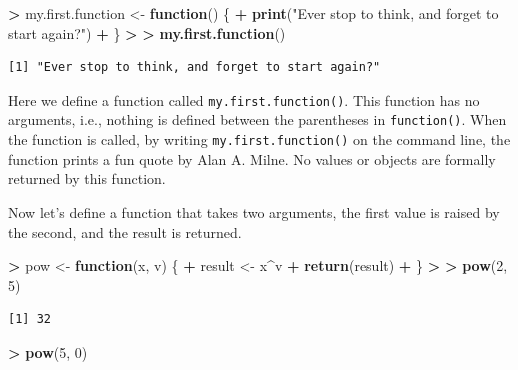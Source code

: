 \documentclass[]{krantz}
\makeatletter
\newenvironment{Shaded}{\begin{snugshade}}{\end{snugshade}}
\newcommand{\ControlFlowTok}[1]{\textcolor[rgb]{0.27,0.27,0.27}{\textbf{#1}}}
\newcommand{\DecValTok}[1]{\textcolor[rgb]{0.06,0.06,0.06}{#1}}
\newcommand{\ErrorTok}[1]{\textcolor[rgb]{0.14,0.14,0.14}{\textbf{#1}}}
\newcommand{\KeywordTok}[1]{\textcolor[rgb]{0.27,0.27,0.27}{\textbf{#1}}}
\newcommand{\NormalTok}[1]{#1}
\newcommand{\OperatorTok}[1]{\textcolor[rgb]{0.43,0.43,0.43}{\textbf{#1}}}
\newcommand{\StringTok}[1]{\textcolor[rgb]{0.5,0.5,0.5}{#1}}
\newenvironment{kframe}{%
\medskip{}
\setlength{\fboxsep}{.8em}
 \def\at@end@of@kframe{}%
 \ifinner\ifhmode%
  \def\at@end@of@kframe{\end{minipage}}%
  \begin{minipage}{\columnwidth}%
 \fi\fi%
 \def\FrameCommand##1{\hskip\@totalleftmargin \hskip-\fboxsep
 \colorbox{shadecolor}{##1}\hskip-\fboxsep
     \hskip-\linewidth \hskip-\@totalleftmargin \hskip\columnwidth}%
 \MakeFramed {\advance\hsize-\width
   \@totalleftmargin\z@ \linewidth\hsize
   \@setminipage}}%
 {\par\unskip\endMakeFramed%
 \at@end@of@kframe}
\renewenvironment{Shaded}{\begin{kframe}}{\end{kframe}}
\makeatother
\begin{document}
\begin{Shaded}
\begin{Highlighting}[]
\OperatorTok{>}\StringTok{ }\NormalTok{my.first.function <-}\StringTok{ }\ControlFlowTok{function}\NormalTok{() \{}
\OperatorTok{+}\StringTok{   }\KeywordTok{print}\NormalTok{(}\StringTok{"Ever stop to think, and forget to start again?"}\NormalTok{)}
\OperatorTok{+}\StringTok{ }\NormalTok{\}}
\OperatorTok{>}\StringTok{ }
\ErrorTok{>}\StringTok{ }\KeywordTok{my.first.function}\NormalTok{()}
\end{Highlighting}
\end{Shaded}

\begin{verbatim}
[1] "Ever stop to think, and forget to start again?"
\end{verbatim}

Here we define a function called \texttt{my.first.function()}. This function has no arguments, i.e., nothing is defined between the parentheses in \texttt{function()}. When the function is called, by writing \texttt{my.first.function()} on the command line, the function prints a fun quote by Alan A. Milne. No values or objects are formally returned by this function.

Now let's define a function that takes two arguments, the first value is raised by the second, and the result is returned.

\begin{Shaded}
\begin{Highlighting}[]
\OperatorTok{>}\StringTok{ }\NormalTok{pow <-}\StringTok{ }\ControlFlowTok{function}\NormalTok{(x, v) \{}
\OperatorTok{+}\StringTok{   }\NormalTok{result <-}\StringTok{ }\NormalTok{x}\OperatorTok{^}\NormalTok{v}
\OperatorTok{+}\StringTok{   }\KeywordTok{return}\NormalTok{(result)}
\OperatorTok{+}\StringTok{ }\NormalTok{\}}
\OperatorTok{>}\StringTok{ }
\ErrorTok{>}\StringTok{ }\KeywordTok{pow}\NormalTok{(}\DecValTok{2}\NormalTok{, }\DecValTok{5}\NormalTok{)}
\end{Highlighting}
\end{Shaded}

\begin{verbatim}
[1] 32
\end{verbatim}

\begin{Shaded}
\begin{Highlighting}[]
\OperatorTok{>}\StringTok{ }\KeywordTok{pow}\NormalTok{(}\DecValTok{5}\NormalTok{, }\DecValTok{0}\NormalTok{)}
\end{Highlighting}
\end{Shaded}
\end{document}
